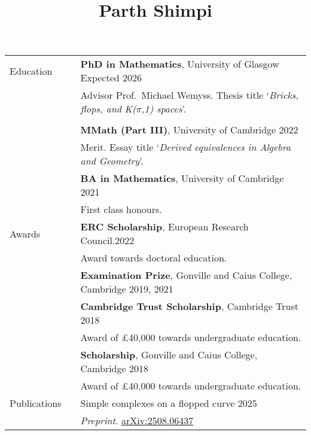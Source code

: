 \documentclass[10pt]{article}
\newcommand{\nextItem}{\\[0.25em]}
\newcommand{\nextSection}{\\[0.5em]}
\newcommand{\subtext}[1]{%
    \\[0.25em]&&%
    \begin{minipage}[c]{4.3in}%
        #1%
    \end{minipage}%
    \\\\[-0.6em]%
}
\begin{document}
\title{Parth Shimpi\normalsize{}
    \raisebox{-0.1em}{\huge\(\vert\)}
    }
%
\date{}
\maketitle
\thispagestyle{fancy}
\vspace{-5.5em}
\begin{longtable}{>{\raggedleft\arraybackslash}p{0.8in}>{}p{0.05in}>{}p{5.7in}}
    Education%
        && \textbf{PhD in Mathematics},
           University of Glasgow
           \hfill Expected 2026
           \subtext{Advisor Prof.\ Michael Wemyss. Thesis title `\emph{Bricks,
           flops, and K(\(\pi\),1) spaces}'.}
        && \textbf{MMath (Part III)},
           University of Cambridge
           \hfill 2022\\
        && Merit. Essay title `\emph{Derived equivalences in Algebra and
        Geometry}'.
        \nextItem
        && \textbf{BA in Mathematics},
           University of Cambridge
           \hfill 2021\\
        && First class honours.
        \nextSection
    Awards%
        && \textbf{ERC Scholarship}, European Research Council.\hfill 2022\\
        && Award towards doctoral education. \nextItem
        && \textbf{Examination Prize}, Gonville and Caius College, Cambridge
        \hfill 2019, 2021\nextItem
        && \textbf{Cambridge Trust Scholarship}, Cambridge Trust \hfill 2018\\
        && Award of £40,000 towards undergraduate education. \nextItem
        && \textbf{Scholarship}, Gonville and Caius College, Cambridge \hfill 2018\\
        && Award of £40,000 towards undergraduate education. \nextSection
    Publications%
        && Simple complexes on a flopped curve \hfill 2025\\
        && \emph{Preprint.}
        \href{https://arxiv.org/abs/2508.06437}{arXiv:2508.06437}

\end{longtable}
\end{document}

